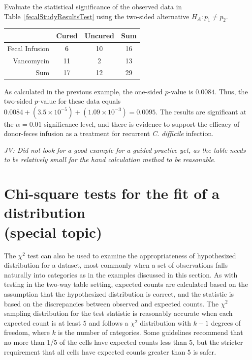\begin{example}{Evaluate the statistical significance of the observed data in Table~\ref{fecalStudyResultsTest} using the two-sided alternative $H_A: p_1 \neq p_2$.}
\begin{table}[h]
	\centering
	\color{gray}
	\begin{tabular}{r|cc|c}
		\hline
		& Cured & Uncured & Sum \\ 
		\hline
		Fecal Infusion & \textcolor{black}{6} & \textcolor{black}{10} & 16 \\ 
		Vancomycin & \textcolor{black}{11} & \textcolor{black}{2} & 13 \\ 
		\hline
		Sum & 17 & 12 & 29 \\ 
		\hline
	\end{tabular}
\end{table}	

As calculated in the previous example, the one-sided $p$-value is $0.0084$. Thus, the two-sided $p$-value for these data equals $0.0084 + (3.5 \times 10^{-5}) + (1.09 \times 10^{-3}) = 0.0095$. The results are significant at the $\alpha = 0.01$ significance level, and there is evidence to support the efficacy of donor-feces infusion as a treatment for recurrent \textit{C. difficile} infection.

\end{example}

\textit{JV: Did not look for a good example for a guided practice yet, as the table needs to be relatively small for the hand calculation method to be reasonable.}


\section[Chi-square tests for the fit of a distribution. (special topic)]{Chi-square tests for the fit of a distribution \\(special topic)}
\label{oneWayChiSquare}

The $\chi^2$ test can also be used to examine the appropriateness of hypothesized distribution for a dataset, most commonly when a set of observations falls naturally into categories as in the examples discussed in this section. As with testing in the two-way table setting, expected counts are calculated based on the assumption that the hypothesized distribution is correct, and the statistic is based on the discrepancies between observed and expected counts. The  $\chi^2$ sampling distribution for the test statistic is reasonably accurate when each expected count is at least 5 and follows a $\chi^2$ distribution with $k-1$ degrees of freedom, where $k$ is the number of categories.  Some guidelines recommend that no more than 1/5 of the cells have expected counts less than 5, but the stricter requirement that all cells have expected counts greater than 5 is safer.


